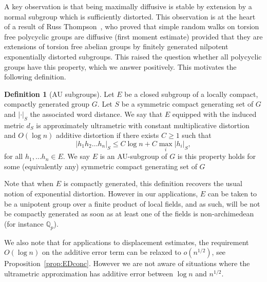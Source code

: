 \documentclass[11pt,leqno]{article}
\theoremstyle{plain}
\theoremstyle{definition}
\newtheorem{definition}[theorem]{Definition}
\theoremstyle{remark}
\numberwithin{equation}{section}
\newcommand{\Q}{\mathbb{Q}}
\begin{document}

A key observation is that being maximally diffusive is stable
by extension by a normal subgroup which is sufficiently distorted.
This observation is at the heart of a result of Russ Thompson~\cite{Thompson}, who proved that simple random walks on torsion free polycyclic groups are diffusive (first moment estimate) provided that they are extensions of torsion free abelian groups by finitely generated nilpotent exponentially distorted subgroups. This raised the question whether all polycyclic groups have this property, which we answer positively.
This motivates the following definition.

\begin{definition}[AU subgroups] Let $E$ be a closed subgroup of a locally
compact, compactly generated group $G$. Let $S$ be a symmetric compact generating set 
of $G$ and $|\cdot|_S$ the associated word distance. We say that $E$ equipped with the induced metric 
$d_S$ is approximately ultrametric with constant multiplicative distortion and $O(\log n)$ additive distortion
if  there exists $C\geq1$ such that 
\[
|h_{1}h_{2}\ldots h_{n}|_{S}\leq C\log n+C\max_{i}|h_{i}|_{S},
\]
for all $h_{1},\ldots h_{n}\in E$. 
We say $E$ is an AU-subgroup of $G$ is 
this property holds for some (equivalently any) symmetric compact generating set of $G$
\end{definition} 

Note that when
$E$ is compactly generated, this definition recovers the usual notion
of exponential distortion. However in our applications, $E$ can be taken to
be a unipotent group over a finite product of local fields, and as
such, will be not be compactly generated as soon as at least one of
the fields is non-archimedean (for instance $\Q_{p}$).

We also note that for applications to displacement estimates, the requirement $O(\log n)$ on the additive error term can be relaxed to $o(n^{1/2})$, see Proposition~\ref{prop:EDconc}.
However we are not aware of situations where the ultrametric approximation has additive error between $\log n$ and $n^{1/2}$.
\end{document}
